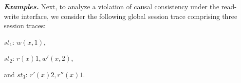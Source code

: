 \documentclass[journal,compsoc]{IEEEtran}
\begin{document}

\noindent \emph{\textbf{Examples.}}
  Next, to analyze a violation of causal consistency under the read-write interface, we consider the following global session trace comprising three  session traces:

  $\mathit{st}_1$: $w(x,1)$, %

 $\mathit{st}_2$: $r(x){1}, w'(x,2)$, %

 and  $\mathit{st}_3$: $r'(x){2}, r''(x){1}$.
\end{document}
